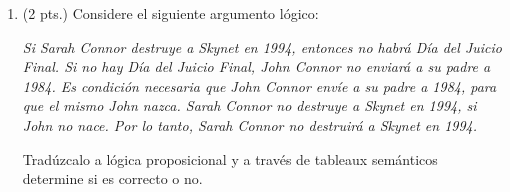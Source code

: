 \documentclass[11pt,letterpaper]{article}
\begin{document}
\begin{enumerate}
  \bigskip

  \item (2 pts.) Considere el siguiente argumento lógico:

    \textit{Si Sarah Connor destruye a Skynet en 1994, entonces no habrá Día del Juicio Final. Si no hay Día del Juicio Final, John Connor no enviará a su padre a 1984. Es condición necesaria que John Connor envíe a su padre a 1984, para que el mismo John nazca. Sarah Connor no destruye a Skynet en 1994, si John no nace. Por lo tanto, Sarah Connor no destruirá a Skynet en 1994.}

   Tradúzcalo a lógica proposicional y a través de tableaux semánticos determine si es correcto o no.

\end{enumerate}
\end{document}
